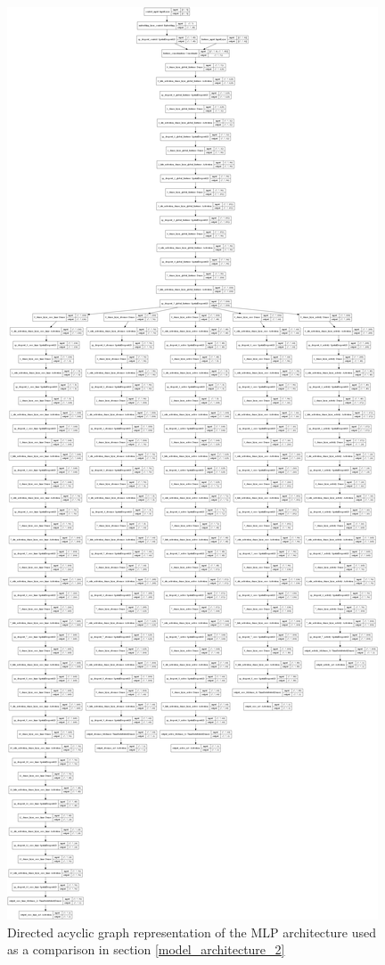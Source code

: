 \begin{figure}[H]
\centering
\includegraphics[width=\textwidth,height=0.7\textheight,keepaspectratio]{images/appendix_B/mlp_2.png}
\caption[\textbf{MLP DAG - Section \ref{model_architecture_2}}]{Directed acyclic graph representation of the MLP architecture used as a comparison in section \ref{model_architecture_2}}
\label{mlp_2_dag}
\end{figure}

